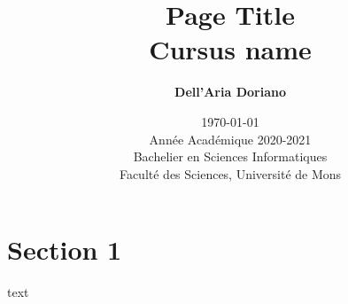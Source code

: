 \documentclass[]{article}
\title{
{\Huge Page Title}\\
Cursus name\\
}
\author{
\textbf{Dell’Aria Doriano}\\
}
\date{\today\\
Année Académique 2020-2021\\
Bachelier en Sciences Informatiques\\
\vspace{1cm}
Faculté des Sciences, Université de Mons}
\begin{document}
\maketitle
\pagebreak


    \section{Section 1}
    text
\end{document}

